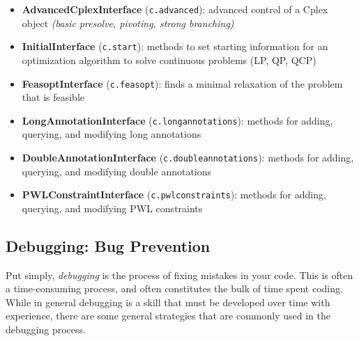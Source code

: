 \documentclass[12pt]{article}
\begin{document}
\begin{itemize}
    \item \textbf{AdvancedCplexInterface} (\texttt{c.advanced}): advanced control of a Cplex object \emph{(basic presolve, pivoting, strong branching)}
    \item \textbf{InitialInterface} (\texttt{c.start}): methods to set starting information for an optimization algorithm to solve continuous problems (LP, QP, QCP)
    \item \textbf{FeasoptInterface} (\texttt{c.feasopt}): finds a minimal relaxation of the problem that is feasible
    \item \textbf{LongAnnotationInterface} (\texttt{c.long\ttul annotations}): methods for adding, querying, and modifying long annotations
    \item \textbf{DoubleAnnotationInterface} (\texttt{c.double\ttul annotations}): methods for adding, querying, and modifying double annotations
    \item \textbf{PWLConstraintInterface} (\texttt{c.pwl\ttul constraints}): methods for adding, querying, and modifying PWL constraints
\end{itemize}

\subsection{Debugging: Bug Prevention}
Put simply, \emph{debugging} is the process of fixing mistakes in your code. This is often a time-consuming process, and often constitutes the bulk of time spent coding.  While in general debugging is a skill that must be developed over time with experience, there are some general strategies that are commonly used in the debugging process.
\end{document}
